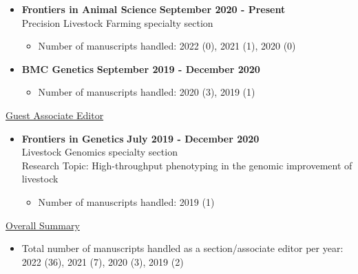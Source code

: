 \documentclass[margin,line,10pt]{res}
\begin{document}
\begin{resume}
\vspace{0.3cm}

\begin{itemize}
\item {\bf Frontiers in Animal Science} \hfill {\bf September 2020 - Present} \\
   Precision Livestock Farming specialty section
  \begin{itemize}
    \item Number of manuscripts handled: 2022 (0), 2021 (1), 2020 (0)
  \end{itemize}
\end{itemize}

\vspace{0.3cm}

\begin{itemize}
\item {\bf BMC Genetics} \hfill {\bf September 2019 - December 2020}
  \begin{itemize}
    \item Number of manuscripts handled: 2020 (3), 2019 (1)
  \end{itemize}
\end{itemize}

\vspace{0.3cm}

\underline{Guest Associate Editor}
\vspace{0.2cm}
\begin{itemize}
\item {\bf Frontiers in Genetics} \hfill  {\bf July 2019 - December 2020} \\
  Livestock Genomics specialty section \\
  Research Topic: High-throughput phenotyping in the genomic improvement of livestock
  \begin{itemize}
    \item Number of manuscripts handled: 2019 (1)
  \end{itemize}
\end{itemize}
\vspace{0.3cm}


\underline{Overall Summary}
 \vspace{.2cm}
\begin{itemize}
\item Total number of manuscripts handled as a section/associate editor per year: 2022 (36), 2021 (7), 2020 (3), 2019 (2) 
\end{itemize}


\vspace{0.3cm}



\end{resume}
\end{document}
